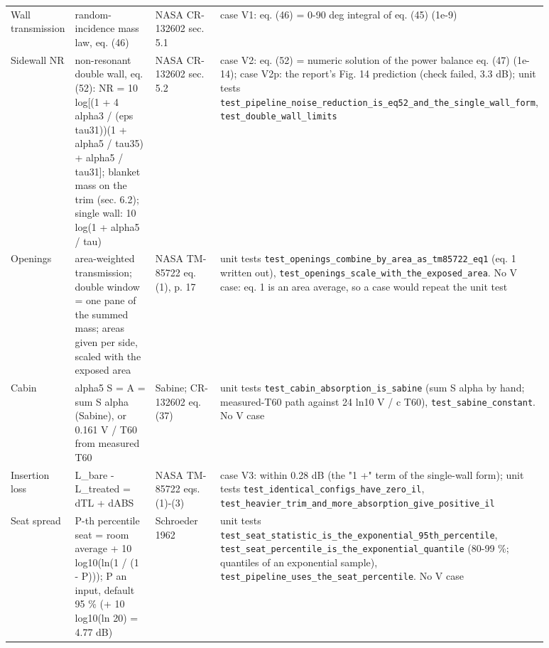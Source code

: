 \documentclass[10pt,a4paper]{article}
\begin{document}
{\begin{longtable}{>{\raggedright\arraybackslash}p{0.095\linewidth}>{\raggedright\arraybackslash}p{0.276\linewidth}>{\raggedright\arraybackslash}p{0.233\linewidth}>{\raggedright\arraybackslash}p{0.276\linewidth}}
Wall transmission & random-incidence mass law, eq. (46) & NASA CR-132602 sec. 5.1 & case V1: eq. (46) = 0-90 deg integral of eq. (45) (1e-9) \\
Sidewall NR & non-resonant double wall, eq. (52): NR = 10 log[(1 + 4 alpha3 / (eps tau31))(1 + alpha5 / tau35) + alpha5 / tau31]; blanket mass on the trim (sec. 6.2); single wall: 10 log(1 + alpha5 / tau) & NASA CR-132602 sec. 5.2 & case V2: eq. (52) = numeric solution of the power balance eq. (47) (1e-14); case V2p: the report's Fig. 14 prediction (check failed, 3.3 dB); unit tests \texttt{test\_\allowbreak{}pipeline\_\allowbreak{}noise\_\allowbreak{}reduction\_\allowbreak{}is\_\allowbreak{}eq52\_\allowbreak{}and\_\allowbreak{}the\_\allowbreak{}single\_\allowbreak{}wall\_\allowbreak{}form}, \texttt{test\_\allowbreak{}double\_\allowbreak{}wall\_\allowbreak{}limits} \\
Openings & area-weighted transmission; double window = one pane of the summed mass; areas given per side, scaled with the exposed area & NASA TM-85722 eq. (1), p. 17 & unit tests \texttt{test\_\allowbreak{}openings\_\allowbreak{}combine\_\allowbreak{}by\_\allowbreak{}area\_\allowbreak{}as\_\allowbreak{}tm85722\_\allowbreak{}eq1} (eq. 1 written out), \texttt{test\_\allowbreak{}openings\_\allowbreak{}scale\_\allowbreak{}with\_\allowbreak{}the\_\allowbreak{}exposed\_\allowbreak{}area}. No V case: eq. 1 is an area average, so a case would repeat the unit test \\
Cabin & alpha5 S = A = sum S alpha (Sabine), or 0.161 V / T60 from measured T60 & Sabine; CR-132602 eq. (37) & unit tests \texttt{test\_\allowbreak{}cabin\_\allowbreak{}absorption\_\allowbreak{}is\_\allowbreak{}sabine} (sum S alpha by hand; measured-T60 path against 24 ln10 V / c T60), \texttt{test\_\allowbreak{}sabine\_\allowbreak{}constant}. No V case \\
Insertion loss & L\_bare - L\_treated = dTL + dABS & NASA TM-85722 eqs. (1)-(3) & case V3: within 0.28 dB (the "1 +" term of the single-wall form); unit tests \texttt{test\_\allowbreak{}identical\_\allowbreak{}configs\_\allowbreak{}have\_\allowbreak{}zero\_\allowbreak{}il}, \texttt{test\_\allowbreak{}heavier\_\allowbreak{}trim\_\allowbreak{}and\_\allowbreak{}more\_\allowbreak{}absorption\_\allowbreak{}give\_\allowbreak{}positive\_\allowbreak{}il} \\
Seat spread & P-th percentile seat = room average + 10 log10(ln(1 / (1 - P))); P an input, default 95 \% (+ 10 log10(ln 20) = 4.77 dB) & Schroeder 1962 & unit tests \texttt{test\_\allowbreak{}seat\_\allowbreak{}statistic\_\allowbreak{}is\_\allowbreak{}the\_\allowbreak{}exponential\_\allowbreak{}95th\_\allowbreak{}percentile}, \texttt{test\_\allowbreak{}seat\_\allowbreak{}percentile\_\allowbreak{}is\_\allowbreak{}the\_\allowbreak{}exponential\_\allowbreak{}quantile} (80-99 \%; quantiles of an exponential sample), \texttt{test\_\allowbreak{}pipeline\_\allowbreak{}uses\_\allowbreak{}the\_\allowbreak{}seat\_\allowbreak{}percentile}. No V case \\

\end{longtable}}
\end{document}

